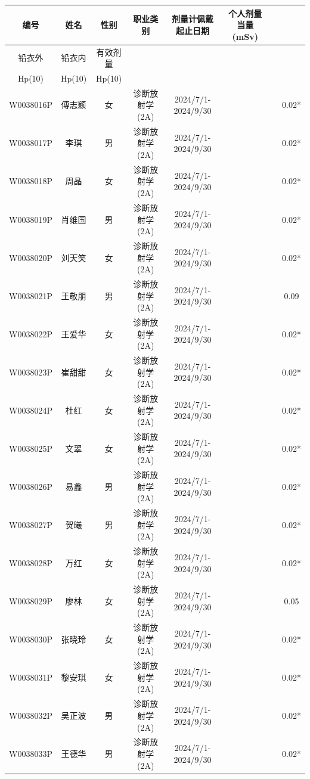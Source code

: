 \begin{table}[H]
\centering
\begin{tabular}{|c|c|c|c|c|c|c|c|}
\hline
编号 & 姓名 & 性别 & 职业类别 & 剂量计佩戴起止日期 & 个人剂量当量(mSv) &  &  \\
\hline
铅衣外 & 铅衣内 & 有效剂量 &  &  &  &  &  \\
\hline
Hp(10) & Hp(10) & Hp(10) &  &  &  &  &  \\
\hline
W0038016P & 傅志颖 & 女 & 诊断放射学(2A) & 2024/7/1-2024/9/30 &  &  & 0.02* \\
\hline
W0038017P & 李琪 & 男 & 诊断放射学(2A) & 2024/7/1-2024/9/30 &  &  & 0.02* \\
\hline
W0038018P & 周晶 & 女 & 诊断放射学(2A) & 2024/7/1-2024/9/30 &  &  & 0.02* \\
\hline
W0038019P & 肖维国 & 男 & 诊断放射学(2A) & 2024/7/1-2024/9/30 &  &  & 0.02* \\
\hline
W0038020P & 刘天笑 & 女 & 诊断放射学(2A) & 2024/7/1-2024/9/30 &  &  & 0.02* \\
\hline
W0038021P & 王敬朋 & 男 & 诊断放射学(2A) & 2024/7/1-2024/9/30 &  &  & 0.09 \\
\hline
W0038022P & 王爱华 & 女 & 诊断放射学(2A) & 2024/7/1-2024/9/30 &  &  & 0.02* \\
\hline
W0038023P & 崔甜甜 & 女 & 诊断放射学(2A) & 2024/7/1-2024/9/30 &  &  & 0.02* \\
\hline
W0038024P & 杜红 & 女 & 诊断放射学(2A) & 2024/7/1-2024/9/30 &  &  & 0.02* \\
\hline
W0038025P & 文翠 & 女 & 诊断放射学(2A) & 2024/7/1-2024/9/30 &  &  & 0.02* \\
\hline
W0038026P & 易鑫 & 男 & 诊断放射学(2A) & 2024/7/1-2024/9/30 &  &  & 0.02* \\
\hline
W0038027P & 贺曦 & 男 & 诊断放射学(2A) & 2024/7/1-2024/9/30 &  &  & 0.02* \\
\hline
W0038028P & 万红 & 女 & 诊断放射学(2A) & 2024/7/1-2024/9/30 &  &  & 0.02* \\
\hline
W0038029P & 廖林 & 女 & 诊断放射学(2A) & 2024/7/1-2024/9/30 &  &  & 0.05 \\
\hline
W0038030P & 张晓玲 & 女 & 诊断放射学(2A) & 2024/7/1-2024/9/30 &  &  & 0.02* \\
\hline
W0038031P & 黎安琪 & 女 & 诊断放射学(2A) & 2024/7/1-2024/9/30 &  &  & 0.02* \\
\hline
W0038032P & 吴正波 & 男 & 诊断放射学(2A) & 2024/7/1-2024/9/30 &  &  & 0.02* \\
\hline
W0038033P & 王德华 & 男 & 诊断放射学(2A) & 2024/7/1-2024/9/30 &  &  & 0.02* \\

\end{tabular}
\end{table}
